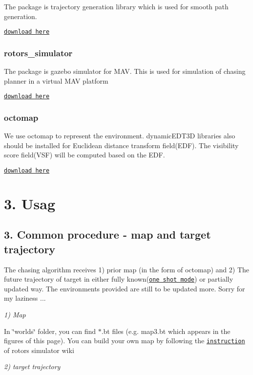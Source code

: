 The package is trajectory generation library which is used for smooth path generation.

\href{https://github.com/icsl-Jeon/traj_gen}{\tt download here}

\subsubsection*{rotors\+\_\+simulator}

The package is gazebo simulator for M\+AV. This is used for simulation of chasing planner in a virtual M\+AV platform

\href{https://github.com/ethz-asl/rotors_simulator}{\tt download here}

\subsubsection*{octomap}

We use octomap to represent the environment. dynamic\+E\+D\+T3D libraries also should be installed for Euclidean distance transform field(\+E\+D\+F). The visibility score field(\+V\+S\+F) will be computed based on the E\+DF.

\href{http://github.com/OctoMap/octomap}{\tt download here}

\section*{3. Usag}

\subsection*{3. Common procedure -\/ map and target trajectory}

The chasing algorithm receives 1) prior map (in the form of octomap) and 2) The future trajectory of target in either fully known(\href{#oneshot}{\tt one shot mode}) or partially updated way. The environments provided are still to be updated more. Sorry for my laziness ...

{\itshape 1) Map}

In \char`\"{}worlds\char`\"{} folder, you can find $\ast$.bt files (e.\+g. map3.\+bt which appears in the figures of this page). You can build your own map by following the \href{https://github.com/ethz-asl/rotors_simulator/wiki/Generate-an-octomap-from-your-world}{\tt instruction} of rotors simulator wiki

{\itshape 2) target trajectory}

